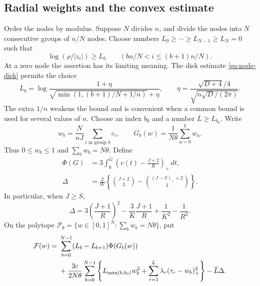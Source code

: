 \subsection{Radial weights and the convex estimate}
Order the nodes by modulus. Suppose $N$ divides $n$, and divide the
nodes into $N$ consecutive groups of $n/N$ nodes. Choose numbers
$L_0\geq\cdots\geq L_{N-1}\geq L_N=0$ such that
\[
 \log(\rho/|z_i|)\geq L_b\qquad
       (bn/N<i\leq(b+1)n/N).
\]
At a zero node the assertion has its limiting meaning. The disk estimate
\eqref{eq:node-disk} permits the choice
\begin{equation}\label{eq:radial-bin-weights}
 L_b=\log\frac{1+\eta}
 {\sqrt{\min(1,(b+1)/N+1/n)}+\eta},
 \qquad \eta=\frac{\sqrt{D+4}/4}{\sqrt{n\sqrt D/(2\pi)}}.
\end{equation}
The extra $1/n$ weakens the bound and is convenient when a common bound
is used for several values of $n$.
Choose an index $b_0$ and a number $\overline L\geq L_{b_0}$.
Write
\[
 w_b=\frac{N}{nJ}\sum_{i\text{ in group }b}c_i,
 \qquad G_b(w)=\frac1{N\theta}\sum_{a=0}^bw_a.
\]
Thus $0\leq w_b\leq1$ and $\sum_bw_b=N\theta$.
Define
\begin{align}
 \Phi(G)&=3\int_0^G\left(v(t)-\frac{J+2}{R}\right)_+\,dt,
                                                        \label{eq:radial-Phi}\\
 \Delta&=\frac2W\left\{\binom{J+2}{3}
                         -\binom{(J-S)_++2}{3}\right\}.
                                                        \label{eq:radial-Delta}
\end{align}
In particular, when $J\geq S$,
\[
 \Delta=3\left(\frac{J+1}{R}\right)^2
       -\frac3K\frac{J+1}{R}+\frac1{K^2}-\frac1{R^2}.
\]
On the polytope $\mathcal P_\theta=\{w\in[0,1]^N:\sum_bw_b=N\theta\}$,
put
\begin{align}
 \mathcal F(w)={}&\sum_{b=0}^{N-1}(L_b-L_{b+1})\Phi(G_b(w))
                                                     \notag\\
 &+\frac{3\varepsilon}{2N\theta}\sum_{b=0}^{N-1}
   \left\{L_{\max(b,b_0)}w_b^2
             +\sum_{r=1}^L\lambda_r(\tau_r-w_b)_+^2\right\}
       -\overline L\Delta.                 \label{eq:radial-functional}
\end{align}

